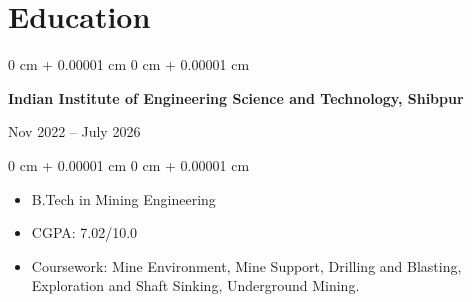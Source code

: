 \documentclass[10pt, letterpaper]{article}
\newenvironment{highlights}{
    \begin{itemize}[
        topsep=0.10 cm,
        parsep=0.10 cm,
        partopsep=0pt,
        itemsep=0pt,
        leftmargin=0 cm + 10pt
    ]
}{
    \end{itemize}
} %
\newenvironment{highlightsforbulletentries}{
    \begin{itemize}[
        topsep=0.10 cm,
        parsep=0.10 cm,
        partopsep=0pt,
        itemsep=0pt,
        leftmargin=10pt
    ]
}{
    \end{itemize}
} %
\newenvironment{onecolentry}{
    \begin{adjustwidth}{
        0 cm + 0.00001 cm
    }{
        0 cm + 0.00001 cm
    }
}{
    \end{adjustwidth}
} %
\newenvironment{twocolentry}[2][]{
    \onecolentry
    \def\secondColumn{#2}
    \setcolumnwidth{\fill, 4.5 cm}
    \begin{paracol}{2}
}{
    \switchcolumn \raggedleft \secondColumn
    \end{paracol}
    \endonecolentry
} %
\begin{document}
    









\section{Education}

\begin{twocolentry}{Nov 2022 – July 2026}
    \textbf{Indian Institute of Engineering Science and Technology, Shibpur}
\end{twocolentry}

\vspace{0.10 cm}
\begin{onecolentry}
    \begin{highlights}
        \item B.Tech in Mining Engineering
        \item  CGPA: 7.02/10.0
        \item Coursework: Mine Environment, Mine Support, Drilling and Blasting, Exploration and Shaft Sinking,
Underground Mining.
    \end{highlights}
\end{onecolentry}
\end{document}

